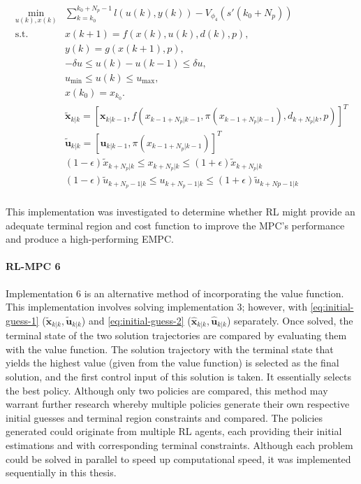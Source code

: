 \begin{subequations} \label{eq:rl-mpc-ocp}
	\begin{align}
		\min_{u(k),x(k)} & \sum_{k = k_0}^{k_0 + N_p-1} {l(u(k), y(k))} - V_{\phi_4}(s'(k_0+N_p)) \\
		\text{s.t.} \quad & x(k+1) = f(x(k), u(k), d(k), p),  \label{eq:rl-mpc-dynamics-constraint} \\
		& y(k) = g(x(k+1), p), \label{eq:rl-mpc-output-constraint} \\
		& -\delta u \leq u(k) - u(k-1) \leq \delta u, \label{eq:rl-mpc-delta-u} \\
		& u_{\min} \leq u(k) \leq u_{\max}, \label{eq:rl-mpc-u-limits}\\
		& x(k_0) = x_{k_0}. \label{eq:rl-pmc-initial} \\
 		&\tilde{\mathbf{x}}_{k|k} = [\mathbf{x}_{k|k-1},f(x_{k-1 + N_p|k-1}, \pi(x_{k-1 + N_p|k-1}), d_{k+N_p|k},p)]^T\\ 
		&\tilde{\mathbf{u}}_{k|k} = [\mathbf{u}_{k|k-1},\pi(x_{k-1 + N_p|k-1})]^T\\
		& (1-\epsilon)\tilde{x}_{k+N_p|k} \leq x_{k+N_p|k} \leq (1+\epsilon)\tilde{x}_{k+N_p|k}\\
		&(1-\epsilon)\tilde{u}_{k+N_p-1|k} \leq u_{k+N_p-1|k} \leq (1+\epsilon) \tilde{u}_{k+Np-1|k}\\
	\end{align}
\end{subequations}

This implementation was investigated to determine whether RL might provide an adequate terminal region and cost function to improve the MPC's performance and produce a high-performing EMPC. 


\paragraph{RL-MPC 6}
Implementation 6 is an alternative method of incorporating the value function. This implementation involves solving implementation 3; however, with \autoref{eq:initial-guess-1} ($\tilde{\mathbf{x}}_{k|k},\tilde{\mathbf{u}}_{k|k}$) and \autoref{eq:initial-guess-2} ($\hat{\mathbf{x}}_{k|k},\hat{\mathbf{u}}_{k|k}$) separately. Once solved, the terminal state of the two solution trajectories are compared by evaluating them with the value function. The solution trajectory with the terminal state that yields the highest value (given from the value function) is selected as the final solution, and the first control input of this solution is taken. It essentially selects the best policy. Although only two policies are compared, this method may warrant further research whereby multiple policies generate their own respective initial guesses and terminal region constraints and compared. The policies generated could originate from multiple RL agents, each providing their initial estimations and with corresponding terminal constraints. Although each problem could be solved in parallel to speed up computational speed, it was implemented sequentially in this thesis.



